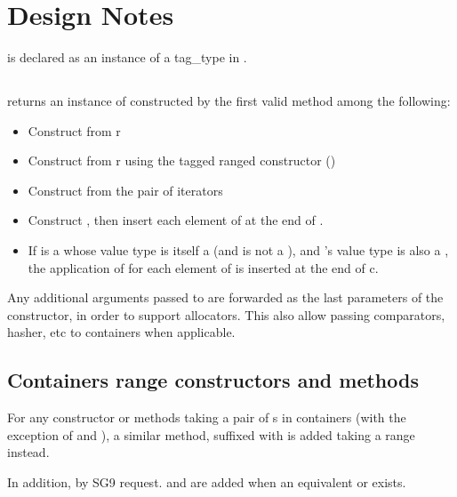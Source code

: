 \documentclass{wg21}
\begin{document}
\section{Design Notes}

 is declared as an instance of a tag_type  in .

\subsection{}

 returns an instance  of  constructed by the first valid method among the following:
\begin{itemize}
    \item Construct  from r
    \item Construct  from r using the tagged ranged constructor ()
    \item Construct  from the pair of iterators 
    \item Construct , then insert each element of  at the end of .
    \item If  is a  whose value type is itself a  (and is not a ), and 's value type is also a , the application of  for each element of  is inserted
    at the end of c.
\end{itemize}

Any additional arguments passed to  are forwarded as the last parameters of the constructor, in order to support allocators.
This also allow passing comparators, hasher, etc to containers when applicable. 

\subsection{Containers range constructors and methods}

For any constructor or methods taking a pair of s in containers (with the exception of  and ), a similar method, suffixed with  is added taking a range instead.

In addition, by SG9 request.  and  are added when an equivalent 
or  exists.
\end{document}

